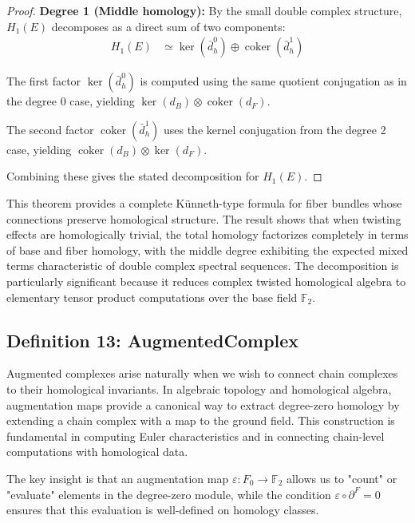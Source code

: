 \documentclass[11pt]{article}
\theoremstyle{plain}
\theoremstyle{definition}
\theoremstyle{remark}
\renewcommand{\ker}{\operatorname{ker}}
\begin{document}
\begin{proof}
\textbf{Degree 1 (Middle homology):} By the small double complex structure, $H_1(E)$ decomposes as a direct sum of two components:
\begin{align}
H_1(E) &\simeq \ker(\bar{d}_h^0) \oplus \operatorname{coker}(\bar{d}_h^1)
\end{align}

The first factor $\ker(\bar{d}_h^0)$ is computed using the same quotient conjugation as in the degree 0 case, yielding $\ker(d_B) \otimes \operatorname{coker}(d_F)$.

The second factor $\operatorname{coker}(\bar{d}_h^1)$ uses the kernel conjugation from the degree 2 case, yielding $\operatorname{coker}(d_B) \otimes \ker(d_F)$.

Combining these gives the stated decomposition for $H_1(E)$.
\end{proof}

This theorem provides a complete Künneth-type formula for fiber bundles whose connections preserve homological structure. The result shows that when twisting effects are homologically trivial, the total homology factorizes completely in terms of base and fiber homology, with the middle degree exhibiting the expected mixed terms characteristic of double complex spectral sequences. The decomposition is particularly significant because it reduces complex twisted homological algebra to elementary tensor product computations over the base field $\mathbb{F}_2$.

\vspace{1em}

\subsection{Definition 13: AugmentedComplex}

Augmented complexes arise naturally when we wish to connect chain complexes to their homological invariants. In algebraic topology and homological algebra, augmentation maps provide a canonical way to extract degree-zero homology by extending a chain complex with a map to the ground field. This construction is fundamental in computing Euler characteristics and in connecting chain-level computations with homological data.

The key insight is that an augmentation map $\varepsilon: F_0 \to \mathbb{F}_2$ allows us to "count" or "evaluate" elements in the degree-zero module, while the condition $\varepsilon \circ \partial^F = 0$ ensures that this evaluation is well-defined on homology classes.
\end{document}
